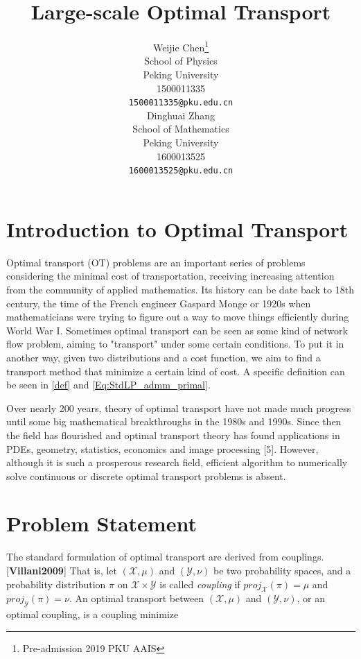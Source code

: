 \documentclass{article}
\title{Large-scale Optimal Transport}
\author{
  Weijie Chen\thanks{Pre-admission 2019 PKU AAIS} \\
  School of Physics\\
  Peking University\\
  1500011335 \\
  \texttt{1500011335@pku.edu.cn} \\
  \And
  Dinghuai Zhang \\
  School of Mathematics\\
  Peking University\\
  1600013525\\
  \texttt{1600013525@pku.edu.cn} \\
}
\begin{document}

\maketitle

\begin{abstract}
  
\end{abstract}

\section{Introduction to Optimal Transport}
Optimal transport (OT) problems are an important series of problems considering the minimal cost of transportation, receiving increasing attention from the community of applied mathematics. Its history can be date back to 18th century, the time of the French engineer Gaspard Monge or 1920s when mathematicians were trying to figure out a way to move things efficiently during World War I. Sometimes optimal transport can be seen as some kind of network flow problem, aiming to "transport" under some certain conditions. To put it in another way, given two distributions and a cost function, we aim to find a transport method that minimize a certain kind of cost. A specific definition can be seen in \ref{def} and \ref{Eq:StdLP_admm_primal}.

Over nearly 200 years, theory of optimal transport have not made much progress until some big mathematical breakthroughs in the 1980s and 1990s. Since then the field has flourished and optimal transport theory has found applications in PDEs, geometry, statistics, economics and image processing [5]. However, although it is such a prosperous research field, efficient algorithm to numerically solve continuous or discrete optimal transport problems is absent. 

\section{Problem Statement}
The standard formulation of optimal transport are derived from couplings. [\textbf{Villani2009}] That is, let $ \left(\mathcal{X}, \mu \right)$ and $\left(\mathcal{Y}, \nu \right)$  be two probability spaces, and a probability distribution $\pi$ on $ \mathcal{X} \times \mathcal{Y} $ is called \emph{coupling} if $ proj_{\mathcal{X}} (\pi) = \mu $ and $ proj_{\mathcal{Y}} (\pi)= \nu $. An optimal transport between $ \left(\mathcal{X}, \mu \right)  $ and $ \left(\mathcal{Y}, \nu \right) $, or an optimal coupling, is a coupling minimize
\end{document}
